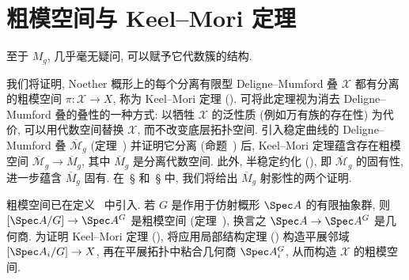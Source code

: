 \section{粗模空间与 Keel--Mori 定理}\label{src:5.4}
\begin{epigraph}
至于 $M_g$, 几乎毫无疑问, 可以赋予它代数簇的结构.
\end{epigraph}
我们将证明, Noether 概形上的每个分离有限型 Deligne--Mumford 叠 $\mathcal X$ 都有分离的粗模空间 $\pi:\mathcal X\to X$, 称为 Keel--Mori 定理 (). 可将此定理视为消去 Deligne--Mumford 叠的叠性的一种方式: 以牺牲 $\mathcal X$ 的泛性质 (例如万有族的存在性) 为代价, 可以用代数空间替换 $\mathcal X$, 而不改变底层拓扑空间. 引入稳定曲线的 Deligne--Mumford 叠 $\overline{\mathcal M}_g$ (定理~) 并证明它分离 (命题~) 后, Keel--Mori 定理蕴含存在粗模空间 $\overline{\mathcal M}_g\to\overline M_g$, 其中 $\overline M_g$ 是分离代数空间. 此外, 半稳定约化 (), 即 $\overline{\mathcal M}_g$ 的固有性, 进一步蕴含 $\overline M_g$ 固有. 在~\S{} 和~\S{} 中, 我们将给出 $\overline M_g$ 射影性的两个证明.

粗模空间已在定义~ 中引入. 若 $G$ 是作用于仿射概形 $\Spec A$ 的有限抽象群, 则 $[\Spec A/G]\to\Spec A^G$ 是粗模空间 (定理~), 换言之 $\Spec A\to\Spec A^G$ 是几何商. 为证明 Keel--Mori 定理 (), 将应用局部结构定理 () 构造平展邻域 $[\Spec A_i/G]\to\mathcal X$, 再在平展拓扑中粘合几何商 $\Spec A_i^G$, 从而构造 $\mathcal X$ 的粗模空间.


